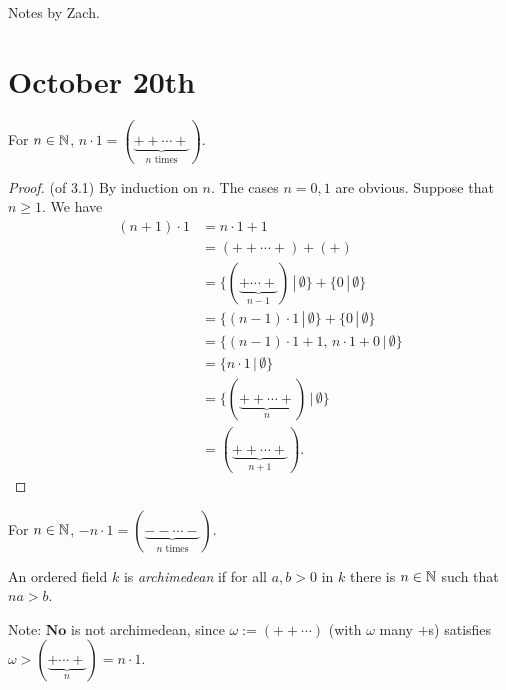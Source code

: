 %
%
%
%

Notes by Zach.

\section*{October 20th}

\begin{lemma}
For $n\in\mathbb{N}$, $n\cdot 1 = (\underbrace{++\cdots+}_{n\text{ times}})$.
\label{3.1}
\end{lemma}

\begin{proof} (of 3.1)
By induction on $n$. The cases $n=0,1$ are obvious.
Suppose that $n\ge 1$. We have
\begin{align*}
(n+1)\cdot 1 &= n\cdot 1 + 1 \\
&= (++\cdots +)+(+) \\
&= \{ (\underbrace{+\cdots+}_{n-1}) \,|\, \emptyset \} + \{ 0 \,|\, \emptyset \} \\
&= \{ (n-1)\cdot1 \,|\, \emptyset \} + \{ 0 \,|\, \emptyset \} \\
&= \{(n-1)\cdot 1 + 1,\, n\cdot 1 + 0 \,|\, \emptyset \} \\
&= \{ n\cdot 1 \,|\, \emptyset \} \\
&= \{ (\underbrace{++\cdots + }_{n}) \,|\, \emptyset \} \\
&= (\underbrace{++\cdots +}_{n+1}).
\end{align*}
\end{proof}

\begin{cor}
For $n\in\mathbb{N}$, $-n\cdot 1 = (\underbrace{- - \cdots -}_{n\text{ times}})$.
\end{cor}

An ordered field $k$ is {\em archimedean} if for all $a,b>0$ in $k$ there is $n\in\mathbb{N}$ such that $na>b$.

Note: $\mathbf{No}$ is not archimedean, since $\omega := (++\cdots)$ (with $\omega$ many $+$s) satisfies $\omega>(\underbrace{+\cdots + }_{n})=n\cdot 1$.

